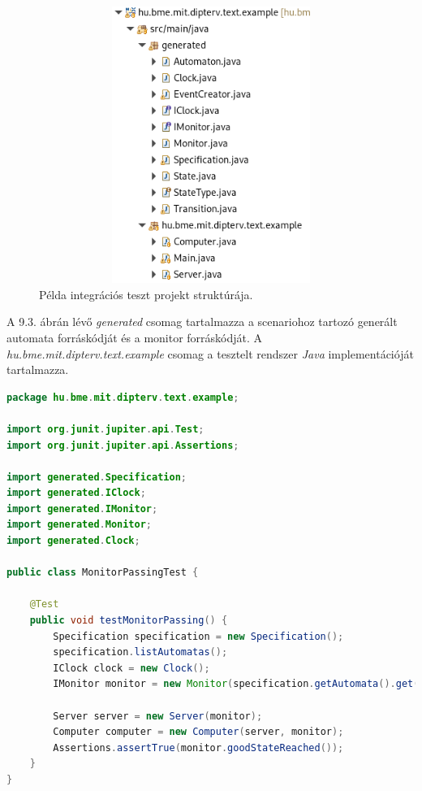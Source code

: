 \begin{figure}[!ht]
    \centering
    \includegraphics[width=150mm, height=9cm, keepaspectratio]{figures/integration_test_structure.png}
    \caption{Példa integrációs teszt projekt struktúrája.}
\end{figure}

A 9.3. ábrán lévő \textit{generated} csomag tartalmazza a scenariohoz tartozó generált automata forráskódját és a monitor forráskódját.
A \textit{hu.bme.mit.dipterv.text.example} csomag a tesztelt rendszer \textit{Java} implementációját tartalmazza.

\begin{lstlisting}[language=java, frame=single, float=ht!, caption={Integrációs teszteset.},captionpos=b]
package hu.bme.mit.dipterv.text.example;

import org.junit.jupiter.api.Test;
import org.junit.jupiter.api.Assertions;

import generated.Specification;
import generated.IClock;
import generated.IMonitor;
import generated.Monitor;
import generated.Clock;

public class MonitorPassingTest {

	@Test
	public void testMonitorPassing() {
		Specification specification = new Specification();
		specification.listAutomatas();
		IClock clock = new Clock();
		IMonitor monitor = new Monitor(specification.getAutomata().get(0), clock);

		Server server = new Server(monitor);
		Computer computer = new Computer(server, monitor);
		Assertions.assertTrue(monitor.goodStateReached());
	}
}
\end{lstlisting}

